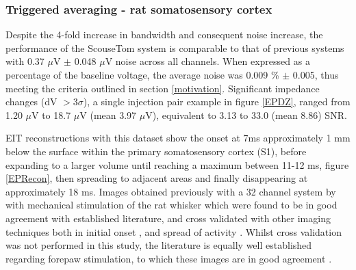 \subsubsection{Triggered averaging - rat somatosensory cortex}

Despite the 4-fold increase in bandwidth and consequent noise increase, the performance of the ScouseTom system is comparable to that of previous systems \cite{Oh2011} with 0.37 $\mu$V $\pm$ 0.048 $\mu$V noise across all channels. When expressed as a percentage of the baseline voltage, the average noise was 0.009 \% $\pm$ 0.005, thus meeting the criteria outlined in section \ref{motivation}.  Significant impedance changes (dV $> 3\sigma$), a single injection pair example in figure \ref{EPDZ}, ranged from 1.20 $\mu$V to 18.7 $\mu$V (mean 3.97 $\mu$V), equivalent to 3.13 to 33.0 (mean 8.86) SNR. 

EIT reconstructions with this dataset show the onset at 7ms approximately 1 mm below the surface within the primary somatosensory cortex (S1), before expanding to a larger volume until reaching a maximum between 11-12 ms, figure \ref{EPRecon}, then spreading to adjacent areas and finally disappearing at approximately 18 ms. Images obtained previously with a 32 channel system by \citet{Aristovich_2016} with mechanical stimulation of the rat whisker which were found to be in good agreement with established literature, and cross validated with other imaging techniques both in initial onset \cite{armstrong1991thalamo}, and spread of activity \cite{petersen2007functional}. Whilst cross validation was not performed in this study, the literature is equally well established regarding forepaw stimulation, to which these images are in good agreement \cite{peeters2001comparing} \cite{masamoto2007relationship} \cite{lowe2007small}.


